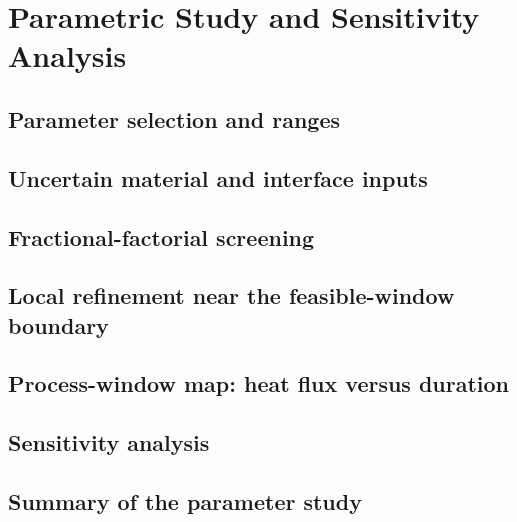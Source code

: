 \chapter{Parametric Study and Sensitivity Analysis}

\section{Parameter selection and ranges}

\section{Uncertain material and interface inputs}

\section{Fractional-factorial screening}

\section{Local refinement near the feasible-window boundary}

\section{Process-window map: heat flux versus duration}

\section{Sensitivity analysis}

\section{Summary of the parameter study}
